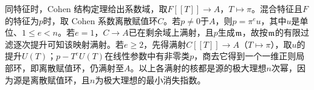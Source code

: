 同特征时，Cohen 结构定理给出系数域，取$F[[T]]\to A$，$T\mapsto\pi$。混合特征且$F$的特征为$p$时，取 Cohen 系数离散赋值环$C$。若$p\ne0$于$A$，则$p=\pi^eu$，其中$u$是单位、$1\le e<n$。若$e=1$，$C\to A$已在剩余域上满射，且$p$生成$\mathfrak m$，故按$\mathfrak m$的有限过滤逐次提升可知该映射满射。若$e\ge2$，先得满射$C[[T]]\to A$（$T\mapsto\pi$），取$u$的提升$U(T)$；$p-T^eU(T)$在线性参数中有非零类$p$，商去它得到一个一维正则局部环，即离散赋值环，仍满射至$A$。以上各满射的核都是源的极大理想$n$次幂，因为源是离散赋值环，且$n$为极大理想的最小消失指数。
\endgroup
